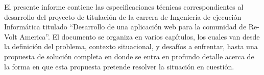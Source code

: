 El presente informe contiene las especificaciones técnicas correspondientes al desarrollo del proyecto de titulación de la carrera de Ingeniería de ejecución Informática titulado “Desarrollo de una aplicación web para la comunidad de Re-Volt America”.
El documento se organiza en varios capítulos, los cuales van desde la definición del problema, contexto situacional, y desafíos a enfrentar, hasta una propuesta de solución completa en donde se entra en profundo detalle acerca de la forma en que esta propuesta pretende resolver la situación en cuestión.
